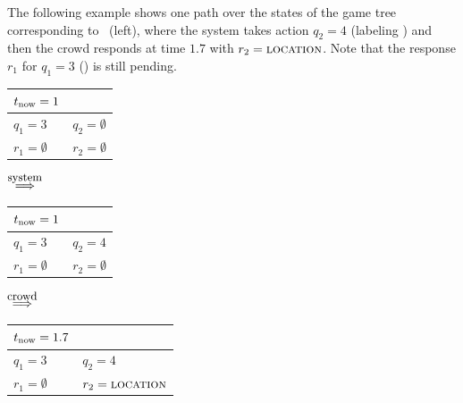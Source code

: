 


The following example shows one path over the states of the game tree corresponding to ~(left),
where the system takes action $q_2 = 4$ (labeling ) and then the crowd responds
at time $1.7$ with $r_2 = \textsc{location}$.
Note that the response $r_1$ for $q_1 = 3$ () is still pending.
\begin{center}
\begin{tabular}{|ll|}
  \hline $t_\text{now} = 1$ & \\
  \hline
  $q_1 = 3$         & $q_2 = \emptyset$ \\
  $r_1 = \emptyset$ & $r_2 = \emptyset$ \\
  \hline
\end{tabular}
$\stackrel{\text{\small system}}{\implies}$
\begin{tabular}{|ll|}
  \hline $t_\text{now} = 1$ & \\
  \hline
  $q_1 = 3$         & $q_2 = 4$ \\
  $r_1 = \emptyset$ & $r_2 = \emptyset$ \\
  \hline
\end{tabular}
$\stackrel{\text{\small crowd}}{\implies}$
\begin{tabular}{|ll|}
  \hline $t_\text{now} = 1.7$ & \\
  \hline
  $q_1 = 3$         & $q_2 = 4$ \\
  $r_1 = \emptyset$ & $r_2 = \text{\textsc{location}}$ \\
  \hline
\end{tabular}
\end{center}

